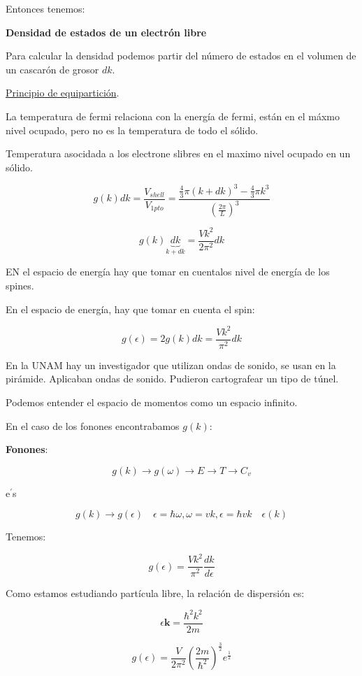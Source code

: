 \documentclass{article}
\begin{document}
Entonces tenemos:


\textbf{Densidad de estados de un electrón libre}


Para calcular la densidad podemos partir del número de estados en el volumen de un cascarón de grosor $dk$. 

\underline{Principio de equipartición}.

La temperatura de fermi relaciona con la energía de fermi, están en el máxmo nivel ocupado, pero no es la temperatura de todo el sólido. 


Temperatura asocidada a los electrone slibres en el maximo nivel ocupado en un sólido. 

\[  g(k)dk = \frac{V_{shell}}{V_{1pto}} =  \frac{\frac{ 4 }{3} \pi (k+dk)^{3} - \frac{4}{3}\pi k^{3}}{ \left( \frac{2\pi}{L}  \right)^{3}   } \]


\[  g(k)\underbrace{dk}_{k + dk} = \boxed{ \frac{Vk^{2}}{2\pi^{2}} dk } \]


EN el espacio de energía hay que tomar en cuentalos nivel de energía de los spines.




En el espacio de energía, hay que tomar en cuenta el spin:


\[ g(\epsilon) = 2g(k)dk = \frac{ Vk^{2} }{\pi^{2}}dk  \]


En la UNAM hay un investigador que utilizan ondas de sonido, se usan en la pirámide. Aplicaban ondas de sonido. Pudieron cartografear un tipo de túnel. 

Podemos entender el espacio de momentos como un espacio infinito.


En el caso de los fonones encontrabamos $g(k)$:


\textbf{Fonones}:


\[ g(k) \to g(\omega) \to E \to T \to C_{v} \]


e$^{\prime}$s


\[ g(k) \to g(\epsilon) \quad \epsilon = \hbar \omega, \omega = vk, \epsilon = \hbar{v}k \quad \epsilon(k)  \]




Tenemos:


\[ g(\epsilon) = \frac{Vk^{2}}{\pi^{2}}  \frac{dk}{d\epsilon} \]


Como estamos estudiando partícula libre, la relación de dispersión es:


\[ \epsilon{\boldsymbol{k}} = \frac{ \hbar^{2} k^{2} }{2m}    \]


\[ g(\epsilon) = \frac{V}{2\pi^{2}} \left( \frac{2m}{\hbar^{2}}   \right)^{\frac{3}{2}} e^{\frac{1}{2}}   \]
\end{document}
